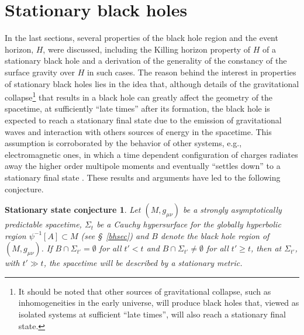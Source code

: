 \documentclass[
12pt,		%
openright,	%
twoside,  %
a4paper,			%
chapter=TITLE,		%
english,			%
french,				%
spanish,			%
brazil				%
]{USPSC-classe/USPSC}
\newtheorem*{state*}{Stationary state conjecture}
\begin{document}
\section{Stationary black holes}\label{kerr}

In the last sections, several properties of the black hole region and the event horizon, $H$, were discussed, including the Killing horizon property of $H$ of a stationary black hole and a derivation of the generality of the constancy of the surface gravity over $H$ in such cases. The reason behind the interest in properties of stationary black holes lies in the idea that, although details of the gravitational collapse\footnote{It should be noted that other sources of gravitational collapse, such as inhomogeneities in the early universe, will produce black holes that, viewed as isolated systems at sufficient ``late times'', will also reach a stationary final state.} that results in a black hole can greatly affect the geometry of the spacetime, at sufficiently ``late times'' after its formation, the black hole is expected to reach a stationary final state due to the emission of gravitational waves and interaction with others sources of energy in the spacetime. This assumption is corroborated by the behavior of other systems, e.g., electromagnetic ones, in which a time dependent configuration of charges radiates away the higher order multipole moments and eventually ``settles down'' to a stationary final state  \cite{Townsend1997,Wald1984}. These results and arguments have led to the following conjecture. 

\begin{state*}
Let $(M,g_{\mu\nu})$ be a strongly asymptotically predictable spacetime, $\Sigma_{t}$ be a Cauchy hypersurface for the globally hyperbolic region $\psi^{-1}[A]\subset M$ (see \S~\ref{bhsec}) and $B$ denote the black hole region of $(M,g_{\mu\nu})$. If $B\cap\Sigma_{t'}=\emptyset$ for all $t'<t$ and $B\cap\Sigma_{t'}\neq\emptyset$ for all $t'\geq t$, then at $\Sigma_{t'}$, with $t'\gg t$, the spacetime will be described by a stationary metric.

\end{state*}
\end{document}
